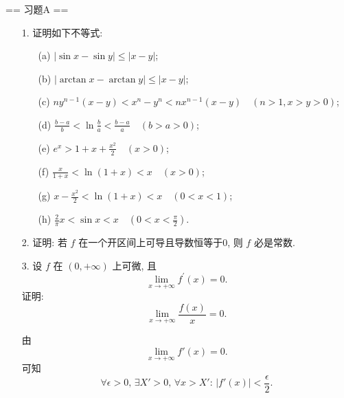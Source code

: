 \newenvironment{solution}{\begin{proofc}[解答]}{\end{proofc}}

== 习题A ==

\begin{enumerate}
    \item[1.]证明如下不等式:
    \begin{enumerate}
        \item[(a)]$\displaystyle \left|\sin x - \sin y\right|\leq \left|x - y\right|$;
        \item[(b)]$\displaystyle \left|\arctan x - \arctan y\right|\leq \left|x - y\right|$;
        \item[(c)]$\displaystyle ny^{n - 1}(x - y)< x^{n} - y^{n}< nx^{n - 1}(x - y)\quad (n > 1,x > y > 0)$;
        \item[(d)]$\displaystyle \frac{b - a}{b} < \ln \frac{b}{a} < \frac{b - a}{a}\quad (b > a > 0)$;
        \item[(e)]$\displaystyle e^x > 1+x+\frac{x^2}{2}\quad (x>0)$;
        \item[(f)]$\displaystyle \frac{x}{1 + x} < \ln (1 + x)< x\quad (x > 0)$;
        \item[(g)]$\displaystyle x-\frac{x^2}{2}<\ln(1+x)<x\quad (0<x<1)$;
        \item[(h)]$\displaystyle \frac{2}{\pi}x<\sin{x}<x\quad (0<x<\frac{\pi}{2})$.
    \end{enumerate}
    \item[2.]证明: 若 $f$ 在一个开区间上可导且导数恒等于0, 则 $f$ 必是常数.
    \item[3.]设 $f$ 在 $(0, + \infty)$ 上可微, 且
    \[\displaystyle \lim_{x\to +\infty}f^{\prime}(x) = 0.\]
    证明:
    \[\displaystyle \lim_{x\to +\infty}\frac{f(x)}{x} = 0.\]
    \begin{solution}
        由
        \[
        \lim_{x\to +\infty}f'(x)=0.
        \]
        可知
        \[
        \forall \epsilon>0,\,\exists X'>0,\,\forall x>X':\,\left|f'(x)\right|<\frac{\epsilon}{2}.
\]
\end{solution}
\end{enumerate}
